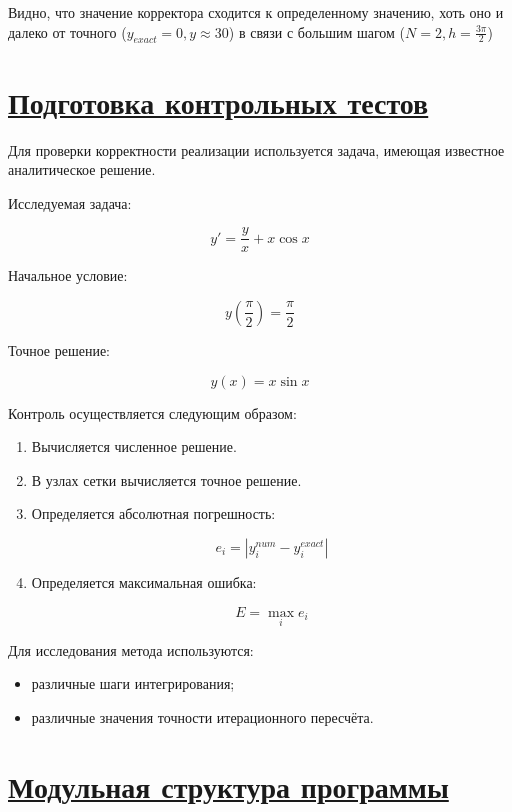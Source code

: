 \documentclass[14pt]{extarticle}
\begin{document}
	Видно, что значение корректора сходится к определенному значению, хоть оно и далеко от точного ($y_{exact} = 0, y \approx 30$) в связи с большим шагом ($N = 2, h = \frac{3\pi}{2}$)
	
	
	
	
	\newpage
	\section{\Large \underline{Подготовка контрольных тестов}}
	
	Для проверки корректности реализации
	используется задача,
	имеющая известное аналитическое решение.
	
	Исследуемая задача:
	
	\[
	y'=\frac{y}{x}+x\cos x
	\]
	
	Начальное условие:
	
	\[
	y\left(\frac{\pi}{2}\right)=\frac{\pi}{2}
	\]
	
	Точное решение:
	
	\[
	y(x)=x\sin x
	\]
	
	Контроль осуществляется следующим образом:
	
	\begin{enumerate}
		\item Вычисляется численное решение.
		\item В узлах сетки вычисляется точное решение.
		\item Определяется абсолютная погрешность:
		
		\[
		e_i=
		|y_i^{num}-y_i^{exact}|
		\]
		
		\item Определяется максимальная ошибка:
		
		\[
		E=
		\max_i e_i
		\]
	\end{enumerate}
	
	Для исследования метода используются:
	
	\begin{itemize}
		\item различные шаги интегрирования;
		\item различные значения точности
		итерационного пересчёта.
	\end{itemize}
	
	
	\section{\Large \underline{Модульная структура программы}}
	
\end{document}
